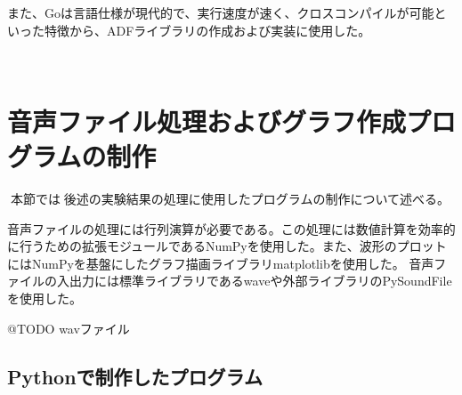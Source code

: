 また、Goは言語仕様が現代的で、実行速度が速く、クロスコンパイルが可能といった特徴から、ADFライブラリの作成および実装に使用した。



\
\section{音声ファイル処理およびグラフ作成プログラムの制作}\label{create-program}

本節では後述の実験結果の処理に使用したプログラムの制作について述べる。

音声ファイルの処理には行列演算が必要である。この処理には数値計算を効率的に行うための拡張モジュールであるNumPyを使用した。また、波形のプロットにはNumPyを基盤にしたグラフ描画ライブラリmatplotlibを使用した。
音声ファイルの入出力には標準ライブラリであるwaveや外部ライブラリのPySoundFileを使用した。

@TODO wavファイル

\subsection{Pythonで制作したプログラム}\label{python}

